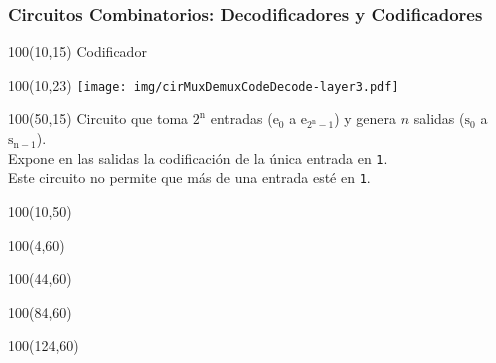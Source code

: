 \documentclass[aspectratio=169]{beamer}
\begin{document}
\begin{frame}[fragile]
    \frametitle{Circuitos Combinatorios: Decodificadores y Codificadores}
    \begin{textblock}{100}(10,15) Codificador \end{textblock}
    \begin{textblock}{100}(10,23) \texttt{[image: img/cirMuxDemuxCodeDecode-layer3.pdf]} \end{textblock}
    \begin{textblock}{100}(50,15)
    \small Circuito que toma $\mathrm{2^n}$ entradas ($\mathrm{e_0}$ a $\mathrm{e_{2^n-1}}$) y genera $n$ salidas ($\mathrm{s_0}$ a $\mathrm{s_{n-1}}$).\\
    \bigskip
    Expone en las salidas la codificación de la única entrada en \texttt{1}.\\ Este circuito no permite que más de una entrada esté en \texttt{1}. 
    \end{textblock}
    \begin{textblock}{100}(10,50)   \end{textblock}
    \begin{textblock}{100}(4,60)   \end{textblock}
    \begin{textblock}{100}(44,60)   \end{textblock}
    \begin{textblock}{100}(84,60)   \end{textblock}
    \begin{textblock}{100}(124,60)  \end{textblock}
\end{frame}
\end{document}
